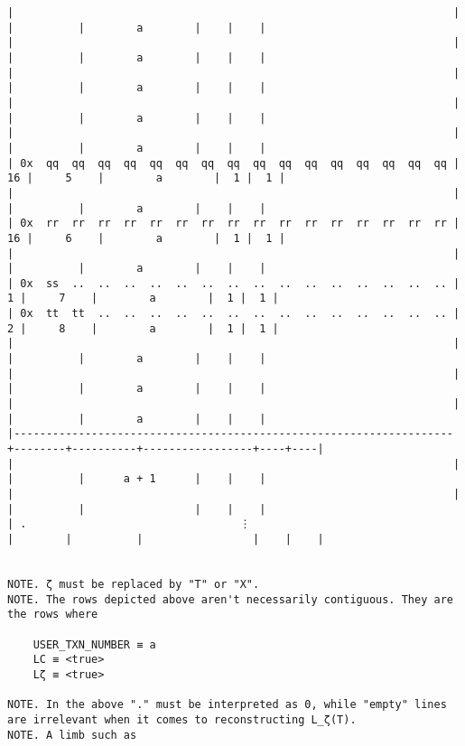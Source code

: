 \documentclass[varwidth=\maxdimen,margin=0.5cm,multi={verbatim}]{standalone}
\begin{document}
\begin{verbatim}
|                                                                    |        |          |        a        |    |    |
|                                                                    |        |          |        a        |    |    |
|                                                                    |        |          |        a        |    |    |
|                                                                    |        |          |        a        |    |    |
|                                                                    |        |          |        a        |    |    |
| 0x  qq  qq  qq  qq  qq  qq  qq  qq  qq  qq  qq  qq  qq  qq  qq  qq |     16 |     5    |        a        |  1 |  1 |
|                                                                    |        |          |        a        |    |    |
| 0x  rr  rr  rr  rr  rr  rr  rr  rr  rr  rr  rr  rr  rr  rr  rr  rr |     16 |     6    |        a        |  1 |  1 |
|                                                                    |        |          |        a        |    |    |
| 0x  ss  ..  ..  ..  ..  ..  ..  ..  ..  ..  ..  ..  ..  ..  ..  .. |      1 |     7    |        a        |  1 |  1 |
| 0x  tt  tt  ..  ..  ..  ..  ..  ..  ..  ..  ..  ..  ..  ..  ..  .. |      2 |     8    |        a        |  1 |  1 |
|                                                                    |        |          |        a        |    |    |
|                                                                    |        |          |        a        |    |    |
|                                                                    |        |          |        a        |    |    |
|--------------------------------------------------------------------+--------+----------+-----------------+----+----|
|                                                                    |        |          |      a + 1      |    |    |
|                                                                    |        |          |                 |    |    |
| .                                 ⋮                                |        |          |                 |    |    |


NOTE. ζ must be replaced by "T" or "X".
NOTE. The rows depicted above aren't necessarily contiguous. They are the rows where

    USER_TXN_NUMBER ≡ a
    LC ≡ <true>
    Lζ ≡ <true>

NOTE. In the above "." must be interpreted as 0, while "empty" lines are irrelevant when it comes to reconstructing L_ζ(T).
NOTE. A limb such as


\end{verbatim}
\end{document}
